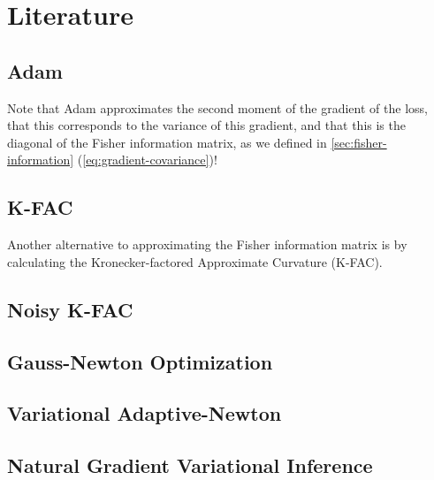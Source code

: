\chapter{Literature}

\section{Adam}


\cite{sutskever2013importance}
\cite{kingma2014adam}

Note that Adam approximates the second moment of the gradient of the loss, that this corresponds to the variance of this gradient, and that this is the diagonal of the Fisher information matrix, as we defined in \cref{sec:fisher-information} (\cref{eq:gradient-covariance})!

\section{K-FAC}

Another alternative to approximating the Fisher information matrix is by calculating the Kronecker-factored Approximate Curvature (K-FAC).
\cite{martens2015optimizing}

\section{Noisy K-FAC}
\cite{zhang2018noisy}

\section{Gauss-Newton Optimization}
\cite{botev2017practical}

\section{Variational Adaptive-Newton}

\cite{khan2017variational}

\section{Natural Gradient Variational Inference}

